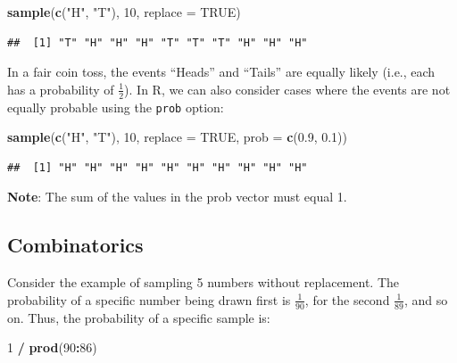 \documentclass[
]{article}
\newenvironment{Shaded}{\begin{snugshade}}{\end{snugshade}}
\newcommand{\AttributeTok}[1]{\textcolor[rgb]{0.13,0.29,0.53}{#1}}
\newcommand{\ConstantTok}[1]{\textcolor[rgb]{0.56,0.35,0.01}{#1}}
\newcommand{\DecValTok}[1]{\textcolor[rgb]{0.00,0.00,0.81}{#1}}
\newcommand{\FloatTok}[1]{\textcolor[rgb]{0.00,0.00,0.81}{#1}}
\newcommand{\FunctionTok}[1]{\textcolor[rgb]{0.13,0.29,0.53}{\textbf{#1}}}
\newcommand{\NormalTok}[1]{#1}
\newcommand{\SpecialCharTok}[1]{\textcolor[rgb]{0.81,0.36,0.00}{\textbf{#1}}}
\newcommand{\StringTok}[1]{\textcolor[rgb]{0.31,0.60,0.02}{#1}}
\begin{document}
\begin{Shaded}
\begin{Highlighting}[]
\FunctionTok{sample}\NormalTok{(}\FunctionTok{c}\NormalTok{(}\StringTok{"H"}\NormalTok{, }\StringTok{"T"}\NormalTok{), }\DecValTok{10}\NormalTok{, }\AttributeTok{replace =} \ConstantTok{TRUE}\NormalTok{)}
\end{Highlighting}
\end{Shaded}

\begin{verbatim}
##  [1] "T" "H" "H" "H" "T" "T" "T" "H" "H" "H"
\end{verbatim}

In a fair coin toss, the events ``Heads'' and ``Tails'' are equally
likely (i.e., each has a probability of \(\frac{1}{2}\)). In R, we can
also consider cases where the events are not equally probable using the
\texttt{prob} option:

\begin{Shaded}
\begin{Highlighting}[]
\FunctionTok{sample}\NormalTok{(}\FunctionTok{c}\NormalTok{(}\StringTok{"H"}\NormalTok{, }\StringTok{"T"}\NormalTok{), }\DecValTok{10}\NormalTok{, }\AttributeTok{replace =} \ConstantTok{TRUE}\NormalTok{, }\AttributeTok{prob =} \FunctionTok{c}\NormalTok{(}\FloatTok{0.9}\NormalTok{, }\FloatTok{0.1}\NormalTok{))}
\end{Highlighting}
\end{Shaded}

\begin{verbatim}
##  [1] "H" "H" "H" "H" "H" "H" "H" "H" "H" "H"
\end{verbatim}

\textbf{Note}: The sum of the values in the prob vector must equal 1.

\hypertarget{combinatorics}{%
\subsection{Combinatorics}\label{combinatorics}}

Consider the example of sampling 5 numbers without replacement. The
probability of a specific number being drawn first is \(\frac{1}{90}\),
for the second \(\frac{1}{89}\), and so on. Thus, the probability of a
specific sample is:

\begin{Shaded}
\begin{Highlighting}[]
\DecValTok{1} \SpecialCharTok{/} \FunctionTok{prod}\NormalTok{(}\DecValTok{90}\SpecialCharTok{:}\DecValTok{86}\NormalTok{)}
\end{Highlighting}
\end{Shaded}
\end{document}
